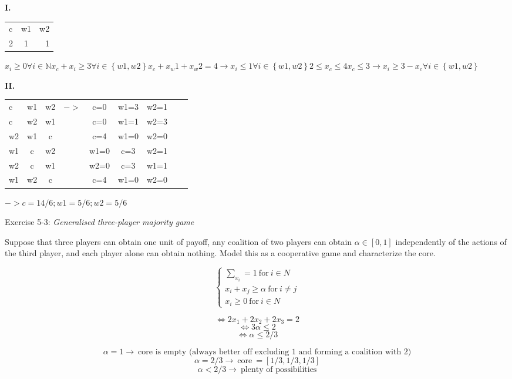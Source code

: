 \documentclass[../main.tex]{subfiles}
\begin{document}
\begin{solution}

\textbf{I.}

\begin{tabular}{ l | c |r }
  c & w1 & w2 \\
  2 & 1 & 1 \\
\end{tabular}

$x_i \geq 0 \forall i \in \mathbb{N}
x_c + x_i \geq 3 \forall i \in \left\{w1, w2\right\}
x_c + x_w1 + x_w2 = 4
\rightarrow
x_i \leq 1 \forall i \in \left\{w1,w2\right\}
2 \leq x_c \leq 4
x_c \leq 3 \rightarrow x_i \geq 3-x_c \forall i \in \left\{w1,w2\right\}$

\textbf{II.}

\begin{tabular}{ l c c c c c c c c }
  c & w1 & w2 & $->$ & c=0 & w1=3 & w2=1\\
  c & w2 & w1 &      & c=0 & w1=1 & w2=3\\
  w2 & w1 & c &      & c=4 & w1=0 & w2=0\\
  w1 & c & w2 &      & w1=0 & c=3 & w2=1\\
  w2 & c & w1 &      & w2=0 & c=3 & w1=1\\
  w1 & w2 & c &      & c=4 & w1=0 & w2=0\\
\end{tabular}

$-> c = 14/6; w1 = 5/6; w2 = 5/6$
\end{solution}

\begin{question}
Exercise 5-3: \textit{Generalised three-player majority game}

Suppose that three players can obtain one unit of payoff, any coalition of two players can obtain $\alpha \in [0,1]$ independently of the actions of the third player, and each player alone can obtain nothing. Model this as a cooperative game and characterize the core.
\end{question}

\begin{solution}
\begin{equation}
 \begin{cases}
    \sum_{x_i} = 1 ~ \text{for} ~ i \in N\\
    x_i + x_j \geq \alpha ~ \text{for} ~ i \neq j\\
    x_i \geq 0 ~ \text{for} ~ i \in N
\end{cases}
\end{equation}

\[ \iff 2x_1 + 2x_2 + 2x_3 = 2 \]
\[ \iff 3\alpha \leq 2 \]
\[ \iff \alpha \leq 2/3 \]

\[ \alpha=1 \rightarrow ~ \text{core is empty (always better off excluding 1 and forming a coalition with 2)} \] 
\[ \alpha=2/3 \rightarrow ~ \text{core} ~ = [1/3, 1/3, 1/3] \]
\[ \alpha<2/3 \rightarrow ~ \text{plenty of possibilities} \]
\end{solution}
\end{document}
